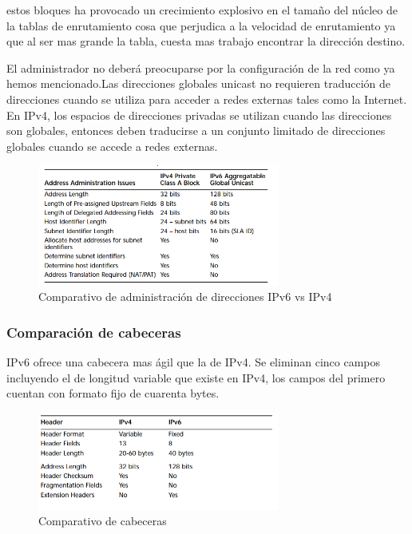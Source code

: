 \documentclass[11pt,a4paper]{article}
\begin{document}
estos bloques ha provocado un crecimiento explosivo en el tamaño del núcleo de la tablas de 
enrutamiento cosa que perjudica a la velocidad de enrutamiento ya que al ser mas grande la tabla, 
cuesta mas trabajo encontrar la dirección destino.\par
El administrador no deberá preocuparse por la configuración de la red como ya hemos mencionado.Las 
direcciones globales unicast no requieren traducción de direcciones cuando se utiliza para acceder a
redes externas tales como la Internet. En IPv4, los espacios de direcciones privadas se utilizan 
cuando las direcciones son globales, entonces deben traducirse a un conjunto limitado de direcciones 
globales cuando se accede a redes externas.

\begin{figure}[h!]
 \centering
 \includegraphics[width=0.71\textwidth]{aaip46.png}
 \caption[Comparativo IPv4, IPv6]{Comparativo de administración de direcciones IPv6 vs IPv4}
\end{figure} \par

\subsubsection{Comparación de cabeceras}
IPv6 ofrece una cabecera mas ágil que la de IPv4. Se eliminan cinco campos incluyendo el de longitud 
variable que existe en IPv4, los campos del primero cuentan con formato fijo de cuarenta bytes.

\begin{figure}[h!]
 \centering
 \includegraphics[width=0.71\textwidth]{compcab.png}
 \caption[Comparativo de cabeceras]{Comparativo de cabeceras }
\end{figure} \par
\end{document}
